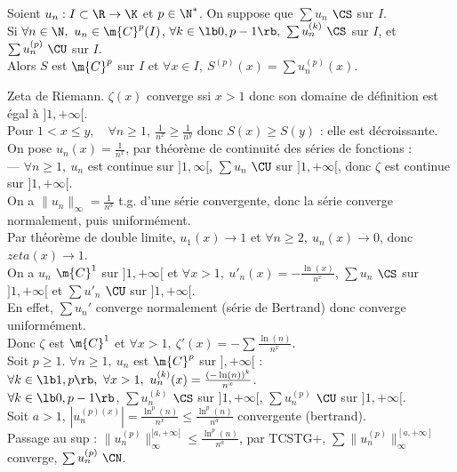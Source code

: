 \documentclass[11pt]{article}
\begin{document}
\begin{prop}{}{}
    Soient $u_n:I\subset\R\to\K$ et $p\in\N^*$. On suppose que $\sum u_n$ $\CS$ sur $I$.\\
    Si $\forall n \in \N, ~ u_n \in \m{C}^p(I)$, $\forall k \in \lb0,p-1\rb, ~ \sum u_n^{(k)} ~ \CS$ sur $I$, et $\sum u_n^{(p)} ~ \CU$ sur $I$.\\
    Alors $S$ est $\m{C}^p$ sur $I$ et $\forall x \in I, ~ S^{(p)}(x)=\sum u_n^{(p)}(x)$.
\end{prop}

\begin{ex}{Zeta de Riemann.}{}
    $\zeta(x)$ converge ssi $x>1$ donc son domaine de définition est égal à $]1,+\infty[$.\\
    Pour $1 < x \leq y$, ~ $\forall n \geq 1, ~ \frac{1}{n^x}\geq \frac{1}{n^y}$ donc $S(x)\geq S(y)$ : elle est décroissante.\\
    On pose $u_n(x)=\frac{1}{n^x}$, par théorème de continuité des séries de fonctions :\\
    --- $\forall n \geq 1, ~ u_n$ est continue sur $]1,\infty[$, $\sum u_n$ $\CU$ sur $]1,+\infty[$, donc $\zeta$ est continue sur $]1,+\infty[$.\\
    On a $\|u_n\|_\infty = \frac{1}{n^a}$ t.g. d'une série convergente, donc la série converge normalement, puis uniformément.\\
    Par théorème de double limite, $u_1(x)\to 1$ et $\forall n \geq 2, ~ u_n(x)\to0$, donc $zeta(x)\to1$.\\
    On a $u_n$ $\m{C}^1$ sur $]1,+\infty[$ et $\forall x > 1, ~ u'_n(x)=-\frac{\ln(x)}{n^x}$, $\sum u_n$ $\CS$ sur $]1,+\infty[$ et $\sum u'_n$ $\CU$ sur $]1,+\infty[$.\\
    En effet, $\sum u_n'$ converge normalement (série de Bertrand) donc converge uniformément.\\
    Donc $\zeta$ est $\m{C}^1$ et $\forall x > 1, ~ \zeta'(x)=-\sum\frac{\ln(n)}{n^x}$.\\
    Soit $p\geq1$. $\forall n \geq 1, ~ u_n$ est $\m{C}^p$ sur $],+\infty[$ : $\forall k \in \lb 1,p\rb, ~ \forall x > 1, ~ u_n^{(k)}(x)=\frac{(-\ln(n))^k}{n^x}$.\\
    $\forall k \in \lb0,p-1\rb$, $\sum u_n^{(k)}$ $\CS$ sur $]1,+\infty[$, $\sum u_n^{(p)}$ $\CU$ sur $]1,+\infty[$.\\
    Soit $a>1$, $|u_n^{(p)(x)}|=\frac{\ln^p(n)}{n^x}\leq\frac{\ln^p(n)}{n^a}$ convergente (bertrand).\\
    Passage au sup : $\|u_n^{(p)}\|_\infty^{[a,+\infty[} \leq \frac{\ln^p(n)}{n^a}$, par TCSTG+, $\sum \|u_n^{(p)}\|_\infty^{[a,+\infty]}$ converge, $\sum u_n^{(p)} ~ \CN$. 
\end{ex}
\end{document}
